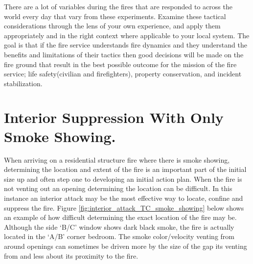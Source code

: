 \documentclass[12pt,oneside]{book}
\begin{document}
There are a lot of variables during the fires that are responded to across the world every day that vary from these experiments.  Examine these tactical considerations through the lens of your own experience, and apply them appropriately and in the right context where applicable to your local system. The goal is that if the fire service understands fire dynamics and they understand the benefits and limitations of their tactics then good decisions will be made on the fire ground that result in the best possible outcome for the mission of the fire service; life safety(civilian and firefighters), property conservation, and incident stabilization.  

\section{Interior Suppression With Only Smoke Showing.} \label{tc:interior_attack_smoke_showing}
When arriving on a residential structure fire where there is smoke showing, determining the location and extent of the fire is an important part of the initial size up and often step one to developing an initial action plan. When the fire is not venting out an opening determining the location can be difficult. In this instance an interior attack may be the most effective way to locate, confine and suppress the fire. Figure \ref{fig:interior_attack_TC_smoke_showing} below shows an example of how difficult determining the exact location of the fire may be. Although the side `B/C' window shows dark black smoke, the fire is actually located in the `A/B' corner bedroom. The smoke color/velocity venting from around openings can sometimes be driven more by the size of the gap its venting from and less about its proximity to the fire. 
\end{document}
